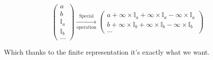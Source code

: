 \begin{equation*}
    \left(\begin{matrix}
        a \\ b \\ \mathbb{I}_a \\ \mathbb{I}_b \\ \dots
    \end{matrix}\right)
    \xrightarrow[\text{operation}]{\text{Special}}
    \left(\begin{matrix}
        a + \infty \times \mathbb{I}_a + \infty \times \mathbb{I}_a - \infty \times \mathbb{I}_a \\ b + \infty \times \mathbb{I}_b + \infty \times \mathbb{I}_b - \infty \times \mathbb{I}_b\\ \dots
    \end{matrix}\right)    
\end{equation*}

Which thanks to the finite representation it's exactly what we want.
